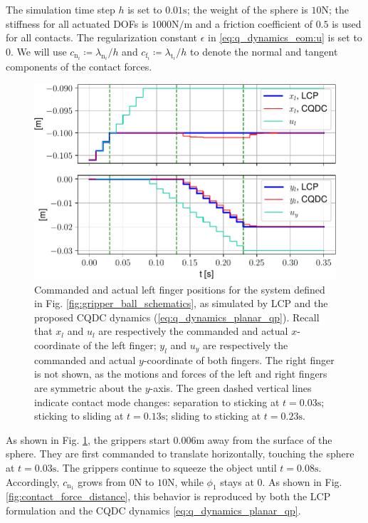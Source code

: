 The simulation time step $h$ is set to $0.01\mathrm{s}$; the weight of the sphere is $10\mathrm{N}$; the stiffness for all actuated DOFs is $1000 \mathrm{N / m}$ and a friction coefficient of $0.5$ is used for all contacts. The regularization constant $\epsilon$ in \eqref{eq:q_dynamics_eom:u} is set to 0. We will use $c_{\mathrm{n}_i} \coloneqq \lambda_{\mathrm{n}_i} / h$ and $c_{\mathrm{f}_i} \coloneqq \lambda_{\mathrm{t}_i} / h$ to denote the normal and tangent components of the contact forces.

\begin{figure}
\centering
\includegraphics[width=0.75\linewidth]{figures/02_quasi_static_dynamics/xy_cmd_vs_xy_true.pdf}
\caption{Commanded and actual left finger positions for the system defined in Fig. \ref{fig:gripper_ball_schematics}, as simulated by LCP and the proposed CQDC dynamics (\ref{eq:q_dynamics_planar_qp}). 
Recall that $x_l$ and $u_l$ are respectively the commanded and actual $x$-coordinate of the left finger; $y_l$ and $u_y$ are respectively the commanded and actual $y$-coordinate of both fingers.
The right finger is not shown, as the motions and forces of the left and right fingers are symmetric about the $y$-axis. 
The green dashed vertical lines indicate contact mode changes: separation to sticking at $t=0.03\mathrm{s}$; sticking to sliding at $t=0.13\mathrm{s}$; sliding to sticking at $t=0.23\mathrm{s}$.}
\label{fig:xy_cmd_vs_xy_true}
\end{figure}

As shown in Fig. \ref{fig:xy_cmd_vs_xy_true}, the grippers start $0.006\mathrm{m}$ away from the surface of the sphere. They are first commanded to translate horizontally, touching the sphere at $t = 0.03\mathrm{s}$. The grippers continue to squeeze the object until $t = 0.08 \mathrm{s}$. Accordingly, $c_{\mathrm{n}_1}$ grows from $0\mathrm{N}$ to $10\mathrm{N}$, while $\phi_1$ stays at 0. As shown in Fig. \ref{fig:contact_force_distance}, this behavior is reproduced by both the LCP formulation and the CQDC dynamics \eqref{eq:q_dynamics_planar_qp}.

